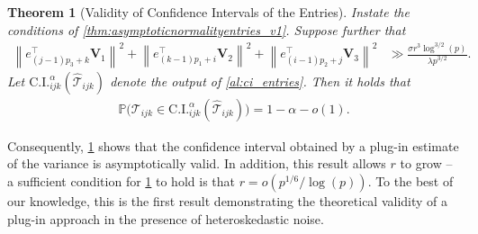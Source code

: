 \documentclass[10pt]{article}
\newcommand{\0}{{\mathbf{0}}}
\newcommand{\1}{{\mathbf{1}}}
\renewcommand{\t}{^{\top}}
\newtheorem{theorem}{Theorem}
\newcommand{\p}{\mathbb{P}}
\renewcommand{\hat}{\widehat}
\renewcommand{\hat}{\widehat}
\begin{document}
\begin{theorem}[Validity of Confidence Intervals of the Entries] \label{thm:civalidity_v1}
Instate the conditions of \cref{thm:asymptoticnormalityentries_v1}.  
Suppose further that
\begin{align*}
\left\|e_{(j-1) p_{3}+k}^{\top} \mathbf{V}_{1}\right\|^{2}+\left\|e_{(k-1) p_{1}+i}\t \mathbf{V}_{2}\right\|^{2}+\left\|e_{(i-1) p_{2}+j}\t \mathbf{V}_{3}\right\|^{2} &\gg  \frac{\sigma r^3  \log^{3/2}(p)}{\lambda p^{3/2}}.
\end{align*}
Let $\mathrm{C.I.}^{\alpha}_{ijk}(\mathcal{\hat T}_{ijk})$ denote the output of \cref{al:ci_entries}.  Then it holds that
\begin{align*}
    \p\bigg( \mathcal{T}_{ijk} \in  \mathrm{C.I.}^{\alpha}_{ijk}(\mathcal{\hat T}_{ijk}) \bigg) = 1- \alpha  - o(1).
\end{align*}
\end{theorem}

Consequently, \cref{thm:civalidity_v1} shows that the confidence interval obtained by a plug-in estimate of the variance is asymptotically valid.   In addition, this result allows $r$ to grow --  a sufficient condition for  \cref{thm:civalidity_v1} to hold is that $r = o(p^{1/6}/\log(p))$.   To the best of our knowledge, this is the first result demonstrating the theoretical validity of a plug-in approach in the presence of heteroskedastic noise.
\end{document}
